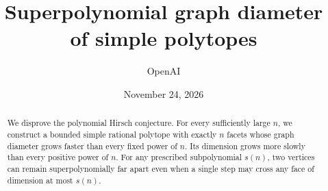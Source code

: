 \documentclass[11pt,letterpaper]{article}
\title{Superpolynomial graph diameter\\of simple polytopes}
\author{OpenAI}
\date{November 24, 2026}
\makeatletter
\theoremstyle{definition}
\theoremstyle{remark}
\renewcommand{\maketitle}{%
  \begin{center}
    {\fontsize{21}{25}\selectfont\bfseries\color{ink}\@title\par}\vspace{6pt}
    {\normalfont\large\@author\par}\vspace{2pt}
    {\normalfont\normalsize\@date\par}
  \end{center}\thispagestyle{plain}}
\makeatother
\begin{document}
\maketitle
\begin{abstract}
\normalsize\noindent
We disprove the polynomial Hirsch conjecture. For every sufficiently large
\(n\), we construct a bounded simple rational polytope with exactly \(n\)
facets whose graph diameter grows faster than every fixed power of \(n\).
Its dimension grows more slowly than every positive power of \(n\).
For any prescribed subpolynomial \(s(n)\), two vertices can remain
superpolynomially far apart even when a single step may cross any face
of dimension at most \(s(n)\).
\end{abstract}

\clearpage
{\small\tableofcontents}
\medskip














\end{document}
